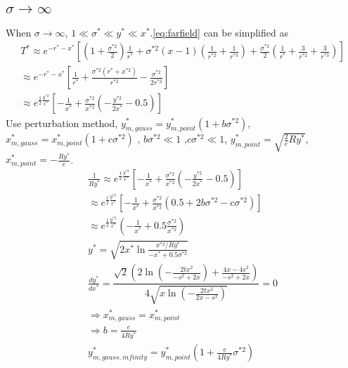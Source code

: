 \documentclass[review, 1p, number, sort&compress,table]{elsarticle}
\begin{document}
	\subsection{$\sigma\rightarrow{\infty}$}
	When $\sigma\rightarrow{\infty}$, $1 \ll \sigma^{*}\ll y^{*} \ll x^{*}$.\autoref{eq:farfield} can be simplified as
	\begin{eqnarray}  \label{eq:farfield.inf.1}
	\nonumber
	T^*
	\approx e^{-r^{*}-x^{*}}\left[ \left(1+\frac{\sigma^{*2}}{2} \right)  \frac{1}{r^{*}} +\sigma^{*2}\left(x-1\right) \left(\frac{1}{r^{*2}}+\frac{1}{r^{*3}}\right)
	+\frac{\sigma^{*2}}{2}\left(\frac{1}{r^{*}}+\frac{3}{r^{*2}} +\frac{3}{r^{*3}}\right)\right]
	\\ \nonumber
	\approx e^{-r^{*}-x^{*}}  \left[\frac{1}{r^{*}}+\frac{\sigma^{*2}\left(r^{*}+x^{*2}\right)}{r^{*2}}-\frac{\sigma^{*2}}{2r^{*2}}\right]
	\\ 
	\approx e^{\frac{1}{2}\frac{y^{*2}}{x^{*}}}  \left[-\frac{1}{x^{*}}+\frac{\sigma^{*2}}{x^{*2}}\left(-\frac{y^{*2}}{2x^{*}}-0.5\right)\right]
	\end{eqnarray} 
	Use perturbation method, $y^*_{m,gauss}=y^*_{m,point}\left(1+b\sigma^{*2}\right)$, $x^*_{m,gauss}=x^*_{m,point}\left(1+c\sigma^{*2}\right)$ , $b\sigma^{*2}\ll1$ ,$c\sigma^{*2}\ll1$, $y^*_{m,point}=\sqrt{\frac{2}{e}Ry^{*}}$,$x^*_{m,point}=-\frac{Ry^{*}}{e}$.
	\begin{eqnarray}  
		\nonumber
		\frac{1}{Ry^{*}} \approx e^{\frac{1}{2}\frac{y^{*2}}{x^{*}}}  \left[-\frac{1}{x^{*}}+\frac{\sigma^{*2}}{x^{*2}}\left(-\frac{y^{*2}}{2x^{*}}-0.5\right)\right]
		\\ \nonumber 
		\approx e^{\frac{1}{2}\frac{y^{*2}}{x^{*}}}  \left[-\frac{1}{x^{*}}+\frac{\sigma^{*2}}{x^{*2}}\left(0.5+2b\sigma^{*2}-c\sigma^{*2}\right)\right]
		\\ \nonumber
		\approx e^{\frac{1}{2}\frac{y^{*2}}{x^{*}}}  \left(-\frac{1}{x^{*}}+0.5\frac{\sigma^{*2}}{x^{*2}}\right)
		\\ \nonumber
		y^*=\sqrt{2x^*\ln{\frac{x^{*2}/Ry^{*}}{-x^{*}+0.5\sigma^{*2}}}}
		\\ \nonumber
		\frac{dy^*}{dx^*}= \dfrac{\sqrt{2}\left(2\ln\left(-\frac{2tx^2}{-s^2+2x}\right)+\frac{4x-4s^2}{-s^2+2x}\right)}{4\sqrt{x\ln\left(-\frac{2tx^2}{2x-s^2}\right)}}=0
		\\ \nonumber
		\Rightarrow x^*_{m,gauss}=x^*_{m,point}
		\\ \nonumber
		\Rightarrow b=\frac{e}{4Ry^{*}} 
		\\
		 y^{*}_{m,gauss,infinity}=y^{*}_{m,point}\left(1+\frac{e}{4Ry^{*}}\sigma^{*2}\right)
		 \label{eq:farfield.inf}
    \end{eqnarray} 
\end{document}
